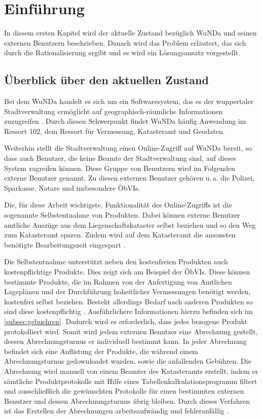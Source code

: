 \chapter{Einführung}
In diesem ersten Kapitel wird der aktuelle Zustand bezüglich \acs{WuNDa} und seinen externen Benutzern beschrieben. Danach wird das Problem erläutert, das sich durch die Rationalisierung ergibt und es wird ein Lösungsansatz vorgestellt.

\section{Überblick über den aktuellen Zustand}
Bei dem \ac{WuNDa} handelt es sich um ein Softwaresystem, das es der wuppertaler Stadtverwaltung ermöglicht auf geographisch-räumliche Informationen zuzugreifen \autocite[vgl.][]{cismet-wunda}. Durch diesen Schwerpunkt findet \ac{WuNDa} häufig Anwendung im Ressort 102, dem Ressort für Vermessung, Katasteramt und Geodaten.

Weiterhin stellt die Stadtverwaltung einen Online-Zugriff auf \ac{WuNDa} bereit, so dass auch Benutzer, die keine Beamte der Stadtverwaltung sind, auf dieses System zugreifen können. Diese Gruppe von Benutzern wird im Folgenden externe Benutzer genannt.
Zu diesen externen Benutzer gehören u.\,a. die Polizei, Sparkasse, Notare und insbesondere \acp{ÖbVI}.

Die, für diese Arbeit wichtigste, Funktionalität des Online-Zugriffs ist die sogenannte Selbstentnahme von Produkten. Dabei können externe Benutzer amtliche Auszüge aus dem Liegenschaftskataster selbst beziehen und so den Weg zum Katasteramt sparen. Zudem wird auf dem Katasteramt die ansonsten benötigte Bearbeitungszeit eingespart \autocite[vgl.][]{wupp-wunda}.

Die Selbstentnahme unterstützt neben den kostenfreien Produkten auch kostenpflichtige Produkte. 
Dies zeigt sich am Beispiel der \acp{ÖbVI}. Diese können bestimmte Produkte, die im Rahmen von der Anfertigung von Amtlichen Lageplänen und der Durchführung hoheitlicher Vermessungen benötigt werden, kostenfrei selbst beziehen.
Besteht allerdings Bedarf nach anderen Produkten so sind diese kostenpflichtig \autocite[vgl.][]{wupp-wunda-oebvi}. Ausführlichere Informationen hierzu befinden sich im \autoref{subsec:gebuehren}.
Dadurch wird es erforderlich, dass jedes bezogene Produkt protokolliert wird.
Somit wird jedem externen Benutzer eine Abrechnung gestellt, dessen Abrechnungsturnus er individuell bestimmt kann.
In jeder Abrechnung befindet sich eine Auflistung der Produkte, die während einem Abrechnungsturnus gedownloadet wurden, sowie die anfallenden Gebühren.
Die Abrechnung wird manuell von einem Beamter des Katasteramts erstellt, indem er sämtliche Produktprotokolle mit Hilfe eines Tabellenkalkulationsprogramm filtert und ausschließlich die gewünschten Protokolle für einen bestimmten externen Benutzer und dessen Abrechnungsturnus übrig bleiben.
Durch dieses Verfahren ist das Erstellen der Abrechnungen arbeitsaufwändig und fehleranfällig \autocite[vgl.][]{sander-abrechnung}.


